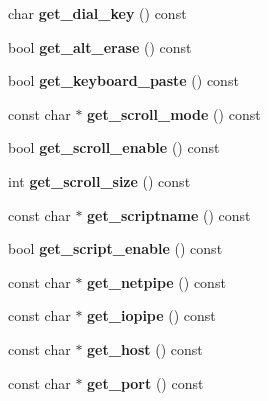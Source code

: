 \begin{DoxyCompactItemize}
char {\bfseries get\+\_\+dial\+\_\+key} () const
\item 
\mbox{\label{class_t_config_aad5986ca6a0226d727769190e54ffaf8}} 
bool {\bfseries get\+\_\+alt\+\_\+erase} () const
\item 
\mbox{\label{class_t_config_a0d800ae6d386319a090780629902355b}} 
bool {\bfseries get\+\_\+keyboard\+\_\+paste} () const
\item 
\mbox{\label{class_t_config_a4eabf0df13e365f45600724c71ea1ea1}} 
const char $\ast$ {\bfseries get\+\_\+scroll\+\_\+mode} () const
\item 
\mbox{\label{class_t_config_ae9c3e5481be709ba11d11726665f52bb}} 
bool {\bfseries get\+\_\+scroll\+\_\+enable} () const
\item 
\mbox{\label{class_t_config_a090eca59924d935019b9e8b1cc6e24f5}} 
int {\bfseries get\+\_\+scroll\+\_\+size} () const
\item 
\mbox{\label{class_t_config_ad3c04d57320e2c1d7a867a73842fdcad}} 
const char $\ast$ {\bfseries get\+\_\+scriptname} () const
\item 
\mbox{\label{class_t_config_a01601efa00a99cb39850337ca0c20311}} 
bool {\bfseries get\+\_\+script\+\_\+enable} () const
\item 
\mbox{\label{class_t_config_a3b866e223e8b396f438a04964c08f6e0}} 
const char $\ast$ {\bfseries get\+\_\+netpipe} () const
\item 
\mbox{\label{class_t_config_ad3892648fab9e86a2821f5ef7e611e2f}} 
const char $\ast$ {\bfseries get\+\_\+iopipe} () const
\item 
\mbox{\label{class_t_config_a3fc979588f085406c1bf788bd6fe715b}} 
const char $\ast$ {\bfseries get\+\_\+host} () const
\item 
\mbox{\label{class_t_config_a50a0c46aa53be750d705cf0399a42264}} 
const char $\ast$ {\bfseries get\+\_\+port} () const
\item 

\end{DoxyCompactItemize}
